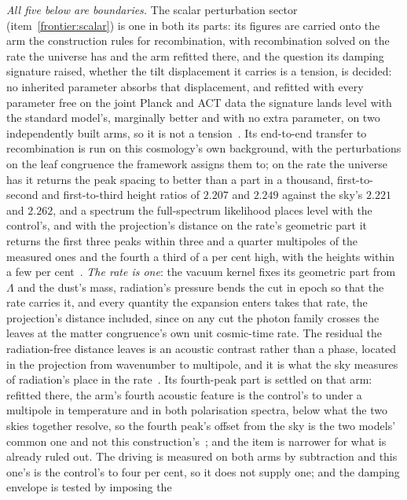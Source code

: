 \documentclass[11pt,a4paper]{article}
\theoremstyle{plain}
\theoremstyle{definition}
\theoremstyle{remark}
\begin{document}
\emph{All five below are boundaries.}  The scalar perturbation sector (item~\ref{frontier:scalar}) is one in both its parts: its figures are carried onto the arm the construction rules for recombination, with recombination solved on the rate the universe has and the arm refitted there, and the question its damping signature raised, whether the tilt displacement it carries is a tension, is decided: no inherited parameter absorbs that displacement, and refitted with every parameter free on the joint Planck and ACT data the signature lands level with the standard model's, marginally better and with no extra parameter, on two independently built arms, so it is not a tension~\cite{JanzenCRcosmology}.  Its end-to-end transfer to recombination is run on this
cosmology's own background, with the perturbations on the leaf congruence the framework assigns them
to; on the rate the universe has it returns the peak spacing to better than a part in a thousand, first-to-second and first-to-third height ratios of $2.207$ and $2.249$ against the sky's $2.221$ and $2.262$, and a spectrum the full-spectrum likelihood places level with the control's, and with the projection's distance on the rate's geometric part it returns the first three peaks within three and a quarter multipoles of the measured ones and the fourth a third of a per cent high, with the heights within a few per cent~\cite{JanzenCRcosmology}.  \emph{The rate is one}: the vacuum kernel fixes its geometric part from $\Lambda$ and the dust's mass, radiation's pressure bends the cut in epoch so that the rate carries it, and every quantity the expansion enters takes that rate, the projection's distance included, since on any cut the photon family crosses the leaves at the matter congruence's own unit cosmic-time rate.  The residual the radiation-free distance leaves is an acoustic contrast rather than a phase, located in the projection from wavenumber to multipole, and it is what the sky measures of radiation's place in the rate~\cite{JanzenCRcosmology}.  Its fourth-peak part is settled on that arm: refitted there, the arm's fourth acoustic feature is the control's to
under a multipole in temperature and in both polarisation spectra, below what the two skies together resolve, so
the fourth peak's offset from the sky is the two models' common one and not this construction's~\cite{JanzenCRcosmology}; and the item is narrower for what is already ruled out.  The driving is measured on both arms by subtraction and this one's is the
control's to four per cent, so it does not supply one; and the damping envelope is tested by imposing the
\end{document}
